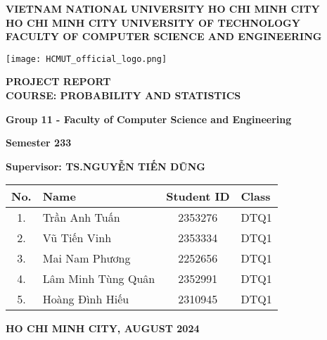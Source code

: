 \documentclass{article}
\date{August 2024}
\begin{document}
	
	\begin{titlepage}
		\centering
		
		\textbf{\large VIETNAM NATIONAL UNIVERSITY HO CHI MINH CITY\\}
		\textbf{\large HO CHI MINH CITY UNIVERSITY OF TECHNOLOGY\\}
		\textbf{\large FACULTY OF COMPUTER SCIENCE AND ENGINEERING\\}
		
		\vspace{1cm}
		
		\texttt{[image: HCMUT\_official\_logo.png]}\\  %
		
		\vspace{1cm}
		
		\textbf{\Huge PROJECT REPORT\\}
		\textbf{\Large COURSE: PROBABILITY AND STATISTICS\\}
		
		\vspace{1cm}
		
		\textbf{\LARGE Group 11 - Faculty of Computer Science and Engineering\\}
		
		\vspace{1cm}
		
		\textbf{\Large Semester 233\\}
		
		
		\textbf{\Large Supervisor: TS.NGUYỄN TIẾN DŨNG\\}
		
		\vspace{1cm}
		
		\begin{tabular}{|c|l|c|l|}
			\hline
			\textbf{No.} & \textbf{Name} & \textbf{Student ID} & \textbf{Class} \\
			\hline
			1. & Trần Anh Tuấn & 2353276  & DTQ1 \\
			2. & Vũ Tiến Vinh & 2353334 & DTQ1 \\
			3. & Mai Nam Phương & 2252656  & DTQ1 \\
			4. & Lâm Minh Tùng Quân & 2352991  & DTQ1 \\
			5. & Hoàng Đình Hiếu & 2310945 & DTQ1 \\
			\hline
		\end{tabular}
		
		\vspace{1cm}
		
		\textbf{HO CHI MINH CITY, AUGUST 2024}
		
	\end{titlepage}
	
\end{document}
